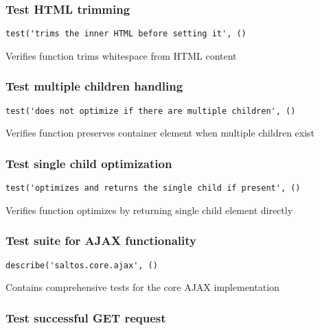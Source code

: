 \documentclass[a4paper]{article}
\begin{document}
\hypertarget{toc506}{}
\subsubsection{Test HTML trimming}

\begin{lstlisting}
test('trims the inner HTML before setting it', ()
\end{lstlisting}

Verifies function trims whitespace from HTML content

\hypertarget{toc507}{}
\subsubsection{Test multiple children handling}

\begin{lstlisting}
test('does not optimize if there are multiple children', ()
\end{lstlisting}

Verifies function preserves container element when multiple children exist

\hypertarget{toc508}{}
\subsubsection{Test single child optimization}

\begin{lstlisting}
test('optimizes and returns the single child if present', ()
\end{lstlisting}

Verifies function optimizes by returning single child element directly

\hypertarget{toc509}{}
\subsubsection{Test suite for AJAX functionality}

\begin{lstlisting}
describe('saltos.core.ajax', ()
\end{lstlisting}

Contains comprehensive tests for the core AJAX implementation

\hypertarget{toc510}{}
\subsubsection{Test successful GET request}
\end{document}

